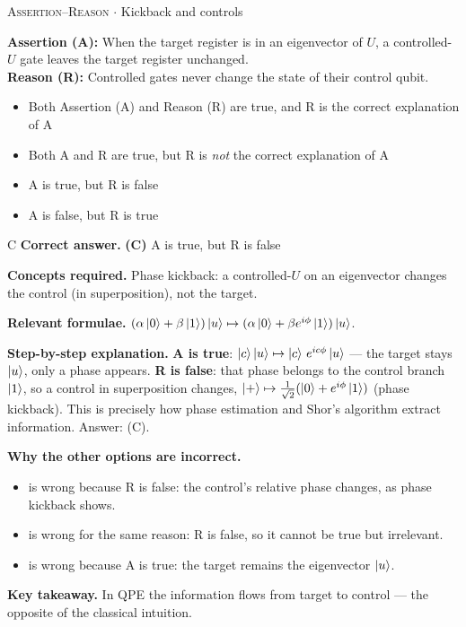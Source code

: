 \documentclass[11pt,a4paper]{article}
\newcommand{\optlabel}[1]{\textbf{(#1)}}
\newcommand{\correctlabel}[1]{\textcolor{okgreen}{\textbf{(#1)}\,\ding{51}}}
\newenvironment{qitem}[1]{\begin{list}{}{\setlength{\leftmargin}{3.3em}\setlength{\labelwidth}{3.1em}%
  \setlength{\labelsep}{0.2em}\setlength{\topsep}{3pt}\setlength{\parsep}{3pt}}\item[\textbf{Q.#1}\hfill]}{\end{list}}
\newcommand{\qsep}{\par\vspace{2pt}{\color{black!15}\hrule}\vspace{4pt}}
\newcommand{\qmeta}[2]{{\footnotesize\color{black!60}\textsc{#1} \;$\cdot$\; #2}\par}
\begin{document}
\begin{qitem}{37}
\qmeta{Assertion--Reason}{Kickback and controls}
\textbf{Assertion (A):} When the target register is in an eigenvector of $U$, a controlled-$U$ gate leaves the target register unchanged.\\[1mm]
\textbf{Reason (R):} Controlled gates never change the state of their control qubit.
\begin{itemize}[leftmargin=2.6em, labelsep=0.4em, itemsep=2pt, topsep=3pt]
\item[\optlabel{A}] Both Assertion (A) and Reason (R) are true, and R is the correct explanation of A
\item[\optlabel{B}] Both A and R are true, but R is \emph{not} the correct explanation of A
\item[\correctlabel{C}] A is true, but R is false
\item[\optlabel{D}] A is false, but R is true
\end{itemize}
\end{qitem}
\begin{solbox}{C}
\textbf{\color{brand}Correct answer.} \textcolor{okgreen}{\textbf{(C)}} A is true, but R is false

\textbf{\color{brand}Concepts required.} Phase kickback: a controlled-$U$ on an eigenvector changes the control (in superposition), not the target.

\textbf{\color{brand}Relevant formulae.} $(\alpha\ket0 + \beta\ket1)\ket u \mapsto (\alpha\ket0 + \beta e^{i\phi}\ket1)\ket u$.

\textbf{\color{brand}Step-by-step explanation.} \textbf{A is true}: $\ket c\ket u \mapsto \ket c\,e^{ic\phi}\ket u$ --- the target stays $\ket u$, only a phase appears. \textbf{R is false}: that phase belongs to the
control branch $\ket1$, so a control in superposition changes, $\ket+ \mapsto \frac{1}{\sqrt2}(\ket0 + e^{i\phi}\ket1)$ (phase kickback). This is precisely how
phase estimation and Shor's algorithm extract information. Answer: (C).

\textbf{\color{brand}Why the other options are incorrect.}
\begin{itemize}[leftmargin=2.4em, itemsep=1pt, topsep=2pt]
\item[\textbf{(A)}] is wrong because R is false: the control's relative phase changes, as phase kickback shows.
\item[\textbf{(B)}] is wrong for the same reason: R is false, so it cannot be true but irrelevant.
\item[\textbf{(D)}] is wrong because A is true: the target remains the eigenvector $\ket u$.
\end{itemize}
\textbf{\color{brand}Key takeaway.} In QPE the information flows from target to control --- the opposite of the classical intuition.
\end{solbox}
\qsep
\end{document}
